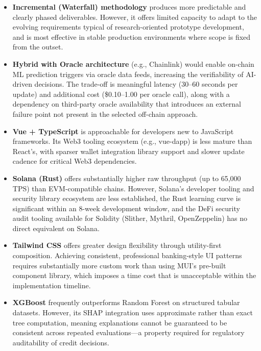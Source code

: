 \documentclass[12pt,a4paper]{report}
\begin{document}
\begin{itemize}[noitemsep]
\item \textbf{Incremental (Waterfall) methodology} produces more predictable and clearly phased deliverables. However, it offers limited capacity to adapt to the evolving requirements typical of research-oriented prototype development, and is most effective in stable production environments where scope is fixed from the outset.

\item \textbf{Hybrid with Oracle architecture} (e.g., Chainlink) would enable on-chain ML prediction triggers via oracle data feeds, increasing the verifiability of AI-driven decisions. The trade-off is meaningful latency (30--60 seconds per update) and additional cost (\$0.10--1.00 per oracle call), along with a dependency on third-party oracle availability that introduces an external failure point not present in the selected off-chain approach.

\item \textbf{Vue + TypeScript} is approachable for developers new to JavaScript frameworks. Its Web3 tooling ecosystem (e.g., vue-dapp) is less mature than React's, with sparser wallet integration library support and slower update cadence for critical Web3 dependencies.

\item \textbf{Solana (Rust)} offers substantially higher raw throughput (up to 65,000 TPS) than EVM-compatible chains. However, Solana's developer tooling and security library ecosystem are less established, the Rust learning curve is significant within an 8-week development window, and the DeFi security audit tooling available for Solidity (Slither, Mythril, OpenZeppelin) has no direct equivalent on Solana.

\item \textbf{Tailwind CSS} offers greater design flexibility through utility-first composition. Achieving consistent, professional banking-style UI patterns requires substantially more custom work than using MUI's pre-built component library, which imposes a time cost that is unacceptable within the implementation timeline.

\item \textbf{XGBoost} frequently outperforms Random Forest on structured tabular datasets. However, its SHAP integration uses approximate rather than exact tree computation, meaning explanations cannot be guaranteed to be consistent across repeated evaluations---a property required for regulatory auditability of credit decisions.


\end{itemize}
\end{document}
